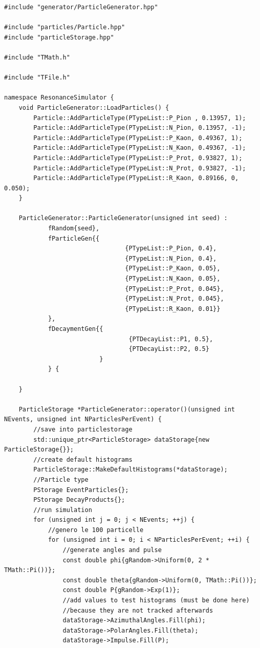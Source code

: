 \documentclass[12pt, a4paper]{article}
\begin{document}
\begin{verbatim}
#include "generator/ParticleGenerator.hpp"

#include "particles/Particle.hpp"
#include "particleStorage.hpp"

#include "TMath.h"

#include "TFile.h"

namespace ResonanceSimulator {
    void ParticleGenerator::LoadParticles() {
        Particle::AddParticleType(PTypeList::P_Pion , 0.13957, 1);
        Particle::AddParticleType(PTypeList::N_Pion, 0.13957, -1);
        Particle::AddParticleType(PTypeList::P_Kaon, 0.49367, 1);
        Particle::AddParticleType(PTypeList::N_Kaon, 0.49367, -1);
        Particle::AddParticleType(PTypeList::P_Prot, 0.93827, 1);
        Particle::AddParticleType(PTypeList::N_Prot, 0.93827, -1);
        Particle::AddParticleType(PTypeList::R_Kaon, 0.89166, 0, 0.050);
    }

    ParticleGenerator::ParticleGenerator(unsigned int seed) :
            fRandom{seed},
            fParticleGen{{
                                 {PTypeList::P_Pion, 0.4},
                                 {PTypeList::N_Pion, 0.4},
                                 {PTypeList::P_Kaon, 0.05},
                                 {PTypeList::N_Kaon, 0.05},
                                 {PTypeList::P_Prot, 0.045},
                                 {PTypeList::N_Prot, 0.045},
                                 {PTypeList::R_Kaon, 0.01}}
            },
            fDecaymentGen{{
                                  {PTDecayList::P1, 0.5},
                                  {PTDecayList::P2, 0.5}
                          }
            } {

    }

    ParticleStorage *ParticleGenerator::operator()(unsigned int NEvents, unsigned int NParticlesPerEvent) {
        //save into particlestorage
        std::unique_ptr<ParticleStorage> dataStorage{new ParticleStorage{}};
        //create default histograms
        ParticleStorage::MakeDefaultHistograms(*dataStorage);
        //Particle type
        PStorage EventParticles{};
        PStorage DecayProducts{};
        //run simulation
        for (unsigned int j = 0; j < NEvents; ++j) {
            //genero le 100 particelle
            for (unsigned int i = 0; i < NParticlesPerEvent; ++i) {
                //generate angles and pulse
                const double phi{gRandom->Uniform(0, 2 * TMath::Pi())};
                const double theta{gRandom->Uniform(0, TMath::Pi())};
                const double P{gRandom->Exp(1)};
                //add values to test histograms (must be done here)
                //because they are not tracked afterwards
                dataStorage->AzimuthalAngles.Fill(phi);
                dataStorage->PolarAngles.Fill(theta);
                dataStorage->Impulse.Fill(P);


\end{verbatim}
\end{document}
